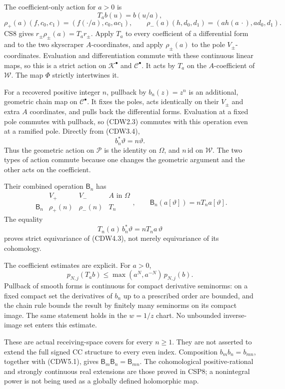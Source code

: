The coefficient-only action for \(a>0\) is \[
T_ab(u)=b(u/a),
\] \[
\rho_+(a)(f,c_0,c_1)=(f(\cdot/a),c_0,a c_1),\qquad
\rho_-(a)(h,d_0,d_1)=(a h(a\,\cdot),a d_0,d_1).
\tag{CDW5.1}
\] CS8 gives \(r_\pm\rho_\pm(a)=T_ar_\pm\). Apply \(T_a\) to every
coefficient of a differential form and to the two skyscraper
\(A\)-coordinates, and apply \(\rho_\pm(a)\) to the pole
\(V_\pm\)-coordinates. Evaluation and differentiation commute with these
continuous linear maps, so this is a strict action on
\(\mathscr K^\bullet\) and \(\mathscr C^\bullet\). It acts by \(T_a\) on
the \(A\)-coefficient of \(\mathscr W\). The map \(\Phi\) strictly
intertwines it.

For a recovered positive integer \(n\), pullback by \(b_n(z)=z^n\) is an
additional, geometric chain map on \(\mathscr C^\bullet\). It fixes the
poles, acts identically on their \(V_\pm\) and extra \(A\) coordinates,
and pulls back the differential forms. Evaluation at a fixed pole
commutes with pullback, so (CDW2.3) commutes with this operation even at
a ramified pole. Directly from (CDW3.4), \[
b_n^*\vartheta=n\vartheta.
\tag{CDW5.2}
\] Thus the geometric action on \(\mathscr P\) is the identity on
\(\Omega\), and \(n\,\mathrm{id}\) on \(\mathscr W\). The two types of
action commute because one changes the geometric argument and the other
acts on the coefficient.

Their combined operation \(\mathsf B_n\) has \[
\begin{array}{c|ccc}
&V_+&V_-&A\text{ in }\Omega\\ \hline
\mathsf B_n&\rho_+(n)&\rho_-(n)&T_n
\end{array},
\qquad
\mathsf B_n(a[\vartheta])=nT_na[\vartheta].
\tag{CDW5.3}
\] The equality \[
T_n(a)\,b_n^*\vartheta=nT_na\,\vartheta
\] proves strict equivariance of (CDW4.3), not merely equivariance of
its cohomology.

The coefficient estimates are explicit. For \(a>0\), \[
p_{N,j}(T_ab)\le\max(a^N,a^{-N})\,p_{N,j}(b).
\tag{CDW5.4}
\] Pullback of smooth forms is continuous for compact derivative
seminorms: on a fixed compact set the derivatives of \(b_n\) up to a
prescribed order are bounded, and the chain rule bounds the result by
finitely many seminorms on its compact image. The same statement holds
in the \(w=1/z\) chart. No unbounded inverse-image set enters this
estimate.

These are actual receiving-space covers for every \(n\ge1\). They are
not asserted to extend the full signed CC structure to every even index.
Composition \(b_mb_n=b_{mn}\), together with (CDW5.1), gives
\(\mathsf B_m\mathsf B_n=\mathsf B_{mn}\). The cohomological
positive-rational and strongly continuous real extensions are those
proved in CSP8; a nonintegral power is not being used as a globally
defined holomorphic map.

